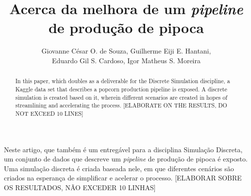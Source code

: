 \documentclass[12pt]{article}
\title{Acerca da melhora de um \textit{pipeline} de produção de pipoca}
\author{Giovanne César O. de Souza\inst{1}, Guilherme Eiji E. Hantani\inst{1},\\Eduardo Gil S. Cardoso\inst{1}, Igor Matheus S. Moreira\inst{1}}
\begin{document}
 

\maketitle

\begin{abstract}
    In this paper, which doubles as a deliverable for the Discrete Simulation discipline, a Kaggle data set that describes a popcorn production pipeline is exposed. A discrete simulation is created based on it, wherein different scenarios are created in hopes of streamlining and accelerating the process. [ELABORATE ON THE RESULTS, DO NOT EXCEED 10 LINES]
\end{abstract}
     
\begin{resumo}
    Neste artigo, que também é um entregável para a disciplina Simulação Discreta, um conjunto de dados que descreve um \textit{pipeline} de produção de pipoca é exposto. Uma simulação discreta é criada baseada nele, em que diferentes cenários são criados na esperança de simplificar e acelerar o processo. [ELABORAR SOBRE OS RESULTADOS, NÃO EXCEDER 10 LINHAS]
\end{resumo}





\end{document}
